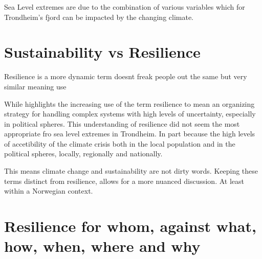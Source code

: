 Sea Level extremes are due to the combination of various variables which for Trondheim's fjord can be impacted by the changing climate. 

\section{Sustainability vs Resilience}
Resilience is a more dynamic term
doesnt freak people out the same
but very similar meaning
use \cite{moser_turbulent_2019}

While \cite{moser_turbulent_2019} highlights the increasing use of the term resilience to mean an organizing strategy for handling complex systems with high levels of uncertainty, especially in political spheres. This understanding of resilience did not seem the most appropriate fro sea level extremes in Trondheim. In part because the high levels of accetibility of the climate crisis both in the local population and in the political spheres, locally, regionally and nationally. 

This means climate change and sustainability are not dirty words. Keeping these terms distinct from resilience, allows for a more nuanced discussion. At least within a Norwegian context.

\section{Resilience for whom, against what, how, when, where and why}




